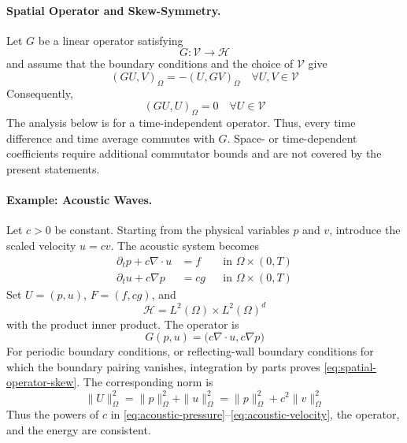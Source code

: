 \documentclass[11pt]{article}
\begin{document}
\paragraph{Spatial Operator and Skew-Symmetry.}
Let \(G\) be a linear operator satisfying
\begin{equation}
G:\mathcal V\longrightarrow\mathcal H \label{eq:spatial-operator-domain}
\end{equation}
and assume that the boundary conditions and the choice of \(\mathcal V\)
give
\begin{equation}
(GU,V)_{\Omega}=-(U,GV)_{\Omega}\quad \forall U,V\in\mathcal V \label{eq:spatial-operator-skew}
\end{equation}
Consequently,
\begin{equation}
(GU,U)_{\Omega}=0\quad \forall U\in\mathcal V \label{eq:spatial-operator-null}
\end{equation}
The analysis below is for a time-independent operator. Thus, every time
difference and time average commutes with \(G\). Space- or time-dependent
coefficients require additional commutator bounds and are not covered by the
present statements.

\paragraph{Example: Acoustic Waves.}
Let \(c>0\) be constant. Starting from the physical variables \(p\) and
\(v\), introduce the scaled velocity \(u=cv\). The acoustic system becomes
\begin{align}
\partial_t p+c\nabla\cdot u&=f &&\text{in }\Omega\times(0,T) \label{eq:acoustic-pressure}\\
\partial_t u+c\nabla p&=cg &&\text{in }\Omega\times(0,T) \label{eq:acoustic-velocity}
\end{align}
Set \(U=(p,u)\), \(F=(f,cg)\), and
\begin{equation}
\mathcal H=L^2(\Omega)\times L^2(\Omega)^d \label{eq:acoustic-hilbert-space}
\end{equation}
with the product inner product. The operator is
\begin{equation}
G(p,u)=\bigl(c\nabla\cdot u,c\nabla p\bigr) \label{eq:acoustic-spatial-operator}
\end{equation}
For periodic boundary conditions, or reflecting-wall boundary conditions
for which the boundary pairing vanishes, integration by parts proves
\eqref{eq:spatial-operator-skew}. The corresponding norm is
\begin{equation}
\|U\|_{\Omega}^2=\|p\|_{\Omega}^2+\|u\|_{\Omega}^2
=\|p\|_{\Omega}^2+c^2\|v\|_{\Omega}^2 \label{eq:acoustic-energy-norm}
\end{equation}
Thus the powers of \(c\) in \eqref{eq:acoustic-pressure}--\eqref{eq:acoustic-velocity},
the operator, and the energy are consistent.
\end{document}
